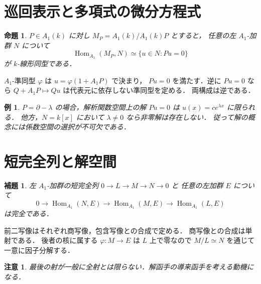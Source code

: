 \documentclass[a5paper,10pt,onecolumn]{jsarticle}
\makeatletter
\theoremstyle{mathnotetheorem}
\newtheorem{lemma}[theorem]{補題}
\newtheorem{proposition}[theorem]{命題}
\newtheorem{example}[theorem]{例}
\newtheorem{remark}[theorem]{注意}
\renewcommand{\proofname}{証明}
\renewenvironment{proof}[1][\proofname]{%
  \par\pushQED{\qed}\normalfont\topsep4\p@\@plus2\p@\relax
  \trivlist\item[\hskip\labelsep\bfseries #1]\ignorespaces
}{\popQED\endtrivlist\@endpefalse}
\makeatother
\begin{document}
\section{巡回表示と多項式の微分方程式}
\begin{proposition}
$P\in A_1(k)$ に対し $M_P=A_1(k)/A_1(k)P$ とすると，
任意の左 $A_1$-加群 $N$ について
\[
 \operatorname{Hom}_{A_1}(M_P,N)
 \simeq\{u\in N:Pu=0\}
\]
が $k$-線形同型である．
\end{proposition}
\begin{proof}
$A_1$-準同型 $\varphi$ は $u=\varphi(1+A_1P)$ で決まり，
$Pu=0$ を満たす．逆に $Pu=0$ なら
$Q+A_1P\mapsto Qu$ は代表元に依存しない準同型を定める．
両構成は逆である．
\end{proof}
\begin{example}
$P=\partial-\lambda$ の場合，解析関数空間上の解 $Pu=0$ は
$u(x)=c e^{\lambda x}$ に限られる．
他方，$N=k[x]$ において $\lambda\ne0$ なら非零解は存在しない．
従って解の概念には係数空間の選択が不可欠である．
\end{example}
\section{短完全列と解空間}
\begin{lemma}
左 $A_1$-加群の短完全列 $0\to L\to M\to N\to0$ と
任意の左加群 $E$ について
\[
 0\longrightarrow\operatorname{Hom}_{A_1}(N,E)
 \longrightarrow\operatorname{Hom}_{A_1}(M,E)
 \longrightarrow\operatorname{Hom}_{A_1}(L,E)
\]
は完全である．
\end{lemma}
\begin{proof}
前二写像はそれぞれ商写像，包含写像との合成で定める．
商写像との合成は単射である．
後者の核に属する $\varphi:M\to E$ は $L$ 上で零なので
$M/L\simeq N$ を通じて一意に因子分解する．
\end{proof}
\begin{remark}
最後の射が一般に全射とは限らない．解函手の導来函手を考える動機になる．
\end{remark}
\end{document}
